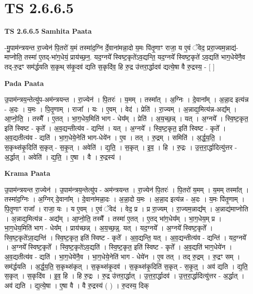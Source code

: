 \documentclass[17pt]{extarticle}
\begin{document}
\section*{ TS 2.6.6.5 }

\textbf{TS 2.6.6.5 } \newline
\textbf{Samhita Paata} \newline

-मु॒पाम॑न्त्रयन्त रा॒ज्येन॑ पि॒तरो॑ य॒मं तस्मा॑द॒ग्नि र्दे॒वाना॑मन्ना॒दो य॒मः पि॑तृ॒णाꣳ राजा॒ य ए॒वं ॅवेद॒ प्ररा॒ज्यम॒न्नाद्य॑-माप्नोति॒ तस्मा॑ ए॒तद्-भा॑ग॒धेयं॒ प्राय॑च्छ॒न॒. यद॒ग्नये᳚ स्विष्ट॒कृते॑ऽव॒द्यन्ति॒ यद॒ग्नये᳚ स्विष्ट॒कृते॑ ऽव॒द्यति॑ भाग॒धेये॑नै॒व तद्-रु॒द्रꣳ सम॑र्द्धयति स॒कृथ् स॑कृ॒दव॑ द्यति स॒कृदि॑व॒ हि रु॒द्र उ॑त्तरा॒र्द्धादव॑ द्यत्ये॒षा वै रु॒द्रस्य॒ - [  ] \newline

\textbf{Pada Paata} \newline

उ॒पाम॑न्त्रय॒न्तेत्यु॑प-अम॑न्त्रयन्त । रा॒ज्येन॑ । पि॒तरः॑ । य॒मम् । तस्मा᳚त् । अ॒ग्निः । दे॒वाना᳚म् । अ॒न्ना॒द इत्य॑न्न - अ॒दः । य॒मः । पि॒तृ॒णाम् । राजा᳚ । यः । ए॒वम् । वेद॑ । प्रेति॑ । रा॒ज्यम् । अ॒न्नाद्य॒मित्य॑न्न-अद्य᳚म् । आ॒प्नो॒ति॒ । तस्मै᳚ । ए॒तत् । भा॒ग॒धेय॒मिति॑ भाग - धेय᳚म् । प्रेति॑ । अ॒य॒च्छ॒न्न् । यत् । अ॒ग्नये᳚ । स्वि॒ष्ट॒कृत॒ इति॑ स्विष्ट - कृते᳚ । अ॒व॒द्यन्तीत्य॑व - द्यन्ति॑ । यत् । अ॒ग्नये᳚ । स्वि॒ष्ट॒कृत॒ इति॑ स्विष्ट - कृते᳚ । अ॒व॒द्यतीत्य॑व - द्यति॑ । भा॒ग॒धेये॒नेति॑ भाग-धेये॑न । ए॒व । तत् । रु॒द्रम् । समिति॑ । अ॒र्द्ध॒य॒ति॒ । स॒कृथ्स॑कृ॒दिति॑ स॒कृत् - स॒कृ॒त् । अवेति॑ । द्य॒ति॒ । स॒कृत् । इ॒व॒ । हि । रु॒द्रः । उ॒त्त॒रा॒र्द्धादित्यु॑त्तर - अ॒र्द्धात् । अवेति॑ । द्य॒ति॒ । ए॒षा । वै । रु॒द्रस्य॑ ।  \newline


\textbf{Krama Paata} \newline

उ॒पाम॑न्त्रयन्त रा॒ज्येन॑ । उ॒पाम॑न्त्रय॒न्तेत्यु॑प - अम॑न्त्रयन्त । रा॒ज्येन॑ पि॒तरः॑ । पि॒तरो॑ य॒मम् । य॒मम् तस्मा᳚त् । तस्मा॑द॒ग्निः । अ॒ग्निर् दे॒वाना᳚म् । दे॒वाना॑मन्ना॒दः । अ॒न्ना॒दो य॒मः । अ॒न्ना॒द इत्य॑न्न - अ॒दः । य॒मः पि॑तृ॒णाम् । पि॒तृ॒णाꣳ राजा᳚ । राजा॒ यः । य ए॒वम् । ए॒वं ॅवेद॑ । वेद॒ प्र । प्र रा॒ज्यम् । रा॒ज्यम॒न्नाद्य᳚म् । अ॒न्नाद्य॑माप्नोति । अ॒न्नाद्य॒मित्य॑न्न - अद्य᳚म् । आ॒प्नो॒ति॒ तस्मै᳚ । तस्मा॑ ए॒तत् । ए॒तद् भा॑ग॒धेय᳚म् । भा॒ग॒धेय॒म् प्र । भा॒ग॒धेय॒मिति॑ भाग - धेय᳚म् । प्राय॑च्छन्न् । अ॒य॒च्छ॒न्न्॒. यत् । यद॒ग्नये᳚ । अ॒ग्नये᳚ स्विष्ट॒कृते᳚ । स्वि॒ष्ट॒कृते॑ऽव॒द्यन्ति॑ । स्वि॒ष्ट॒कृत॒ इति॑ स्विष्ट - कृते᳚ । अ॒व॒द्यन्ति॒ यत् । अ॒व॒द्यन्तीत्य॑व - द्यन्ति॑ । यद॒ग्नये᳚ । अ॒ग्नये᳚ स्विष्ट॒कृते᳚ । स्वि॒ष्ट॒कृते॑ऽव॒द्यति॑ । स्वि॒ष्ट॒कृत॒ इति॑ स्विष्ट - कृते᳚ । अ॒व॒द्यति॑ भाग॒धेये॑न । अ॒व॒द्यतीत्य॑व - द्यति॑ । भा॒ग॒धेये॑नै॒व । भा॒ग॒धेये॒नेति॑ भाग - धेये॑न । ए॒व तत् । तद् रु॒द्रम् । रु॒द्रꣳ सम् । सम॑र्द्धयति । अ॒र्द्ध॒य॒ति॒ स॒कृथ्स॑कृत् । स॒कृथ्स॑कृ॒दव॑ । स॒कृथ्स॑कृ॒दिति॑ स॒कृत् - स॒कृ॒त्॒ । अव॑ द्यति । द्य॒ति॒ स॒कृत् । स॒कृदि॑व । इ॒व॒ हि । हि रु॒द्रः । रु॒द्र उ॑त्तरा॒र्द्धात् । उ॒त्त॒रा॒र्द्धादव॑ । उ॒त्त॒रा॒र्द्धादित्यु॑त्तर - अ॒र्द्धात् । अव॑ द्यति । द्य॒त्ये॒षा । ए॒षा वै । वै रु॒द्रस्य॑ ( ) । रु॒दस्य॒ दिक् \newline
\end{document}
